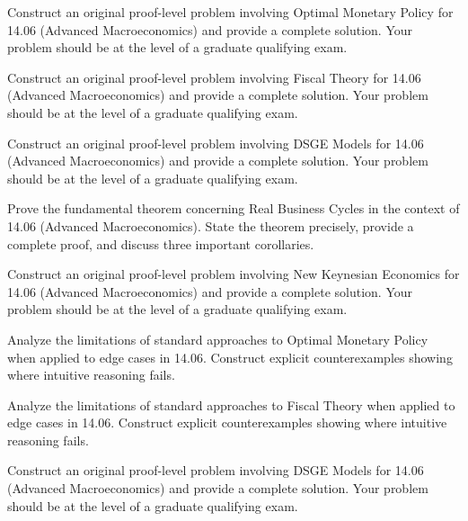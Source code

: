 \documentclass[12pt,a4paper]{exam}
\begin{document}
\begin{questions}
\vspace{0.3cm}

\question[10]
Construct an original proof-level problem involving Optimal Monetary Policy for 14.06 (Advanced Macroeconomics) and provide a complete solution. Your problem should be at the level of a graduate qualifying exam.

\vspace{0.3cm}

\question[3]
Construct an original proof-level problem involving Fiscal Theory for 14.06 (Advanced Macroeconomics) and provide a complete solution. Your problem should be at the level of a graduate qualifying exam.

\vspace{0.3cm}

\question[3]
Construct an original proof-level problem involving DSGE Models for 14.06 (Advanced Macroeconomics) and provide a complete solution. Your problem should be at the level of a graduate qualifying exam.

\vspace{0.3cm}

\question[4]
Prove the fundamental theorem concerning Real Business Cycles in the context of 14.06 (Advanced Macroeconomics). State the theorem precisely, provide a complete proof, and discuss three important corollaries.

\vspace{0.3cm}

\question[3]
Construct an original proof-level problem involving New Keynesian Economics for 14.06 (Advanced Macroeconomics) and provide a complete solution. Your problem should be at the level of a graduate qualifying exam.

\vspace{0.3cm}

\question[5]
Analyze the limitations of standard approaches to Optimal Monetary Policy when applied to edge cases in 14.06. Construct explicit counterexamples showing where intuitive reasoning fails.

\vspace{0.3cm}

\question[2]
Analyze the limitations of standard approaches to Fiscal Theory when applied to edge cases in 14.06. Construct explicit counterexamples showing where intuitive reasoning fails.

\vspace{0.3cm}

\question[3]
Construct an original proof-level problem involving DSGE Models for 14.06 (Advanced Macroeconomics) and provide a complete solution. Your problem should be at the level of a graduate qualifying exam.


\end{questions}
\end{document}
